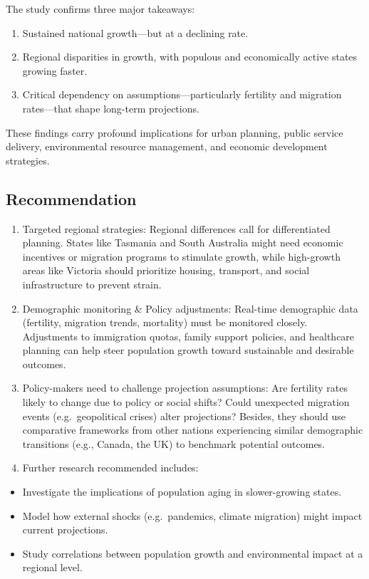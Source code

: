 \documentclass[
  11pt,
]{article}
\begin{document}
The study confirms three major takeaways:

\begin{enumerate}
\def\labelenumi{\arabic{enumi}.}
\item
  Sustained national growth---but at a declining rate.
\item
  Regional disparities in growth, with populous and economically active
  states growing faster.
\item
  Critical dependency on assumptions---particularly fertility and
  migration rates---that shape long-term projections.
\end{enumerate}

These findings carry profound implications for urban planning, public
service delivery, environmental resource management, and economic
development strategies.

\subsection{Recommendation}\label{recommendation}

\begin{enumerate}
\def\labelenumi{\arabic{enumi}.}
\item
  Targeted regional strategies: Regional differences call for
  differentiated planning. States like Tasmania and South Australia
  might need economic incentives or migration programs to stimulate
  growth, while high-growth areas like Victoria should prioritize
  housing, transport, and social infrastructure to prevent strain.
\item
  Demographic monitoring \& Policy adjustments: Real-time demographic
  data (fertility, migration trends, mortality) must be monitored
  closely. Adjustments to immigration quotas, family support policies,
  and healthcare planning can help steer population growth toward
  sustainable and desirable outcomes.
\item
  Policy-makers need to challenge projection assumptions: Are fertility
  rates likely to change due to policy or social shifts? Could
  unexpected migration events (e.g.~geopolitical crises) alter
  projections? Besides, they should use comparative frameworks from
  other nations experiencing similar demographic transitions (e.g.,
  Canada, the UK) to benchmark potential outcomes.
\item
  Further research recommended includes:
\end{enumerate}

\begin{itemize}
\item
  Investigate the implications of population aging in slower-growing
  states.
\item
  Model how external shocks (e.g.~pandemics, climate migration) might
  impact current projections.
\item
  Study correlations between population growth and environmental impact
  at a regional level.
\end{itemize}
\end{document}
